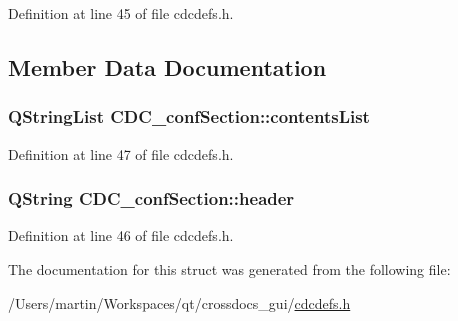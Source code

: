 Definition at line 45 of file cdcdefs.\+h.



\subsection{Member Data Documentation}
\hypertarget{struct_c_d_c__conf_section_a67a9f966e4b9bb43d54f1640421b6f72}{
\subsubsection[{contents\+List}]{\setlength{\rightskip}{0pt plus 5cm}Q\+String\+List C\+D\+C\+\_\+conf\+Section\+::contents\+List}}\label{struct_c_d_c__conf_section_a67a9f966e4b9bb43d54f1640421b6f72}


Definition at line 47 of file cdcdefs.\+h.

\hypertarget{struct_c_d_c__conf_section_a4cd2f8b187662844e29d66c4ddab046e}{
\subsubsection[{header}]{\setlength{\rightskip}{0pt plus 5cm}Q\+String C\+D\+C\+\_\+conf\+Section\+::header}}\label{struct_c_d_c__conf_section_a4cd2f8b187662844e29d66c4ddab046e}


Definition at line 46 of file cdcdefs.\+h.



The documentation for this struct was generated from the following file\+:\begin{DoxyCompactItemize}
\item 
/\+Users/martin/\+Workspaces/qt/crossdocs\+\_\+gui/\hyperlink{cdcdefs_8h}{cdcdefs.\+h}\end{DoxyCompactItemize}
